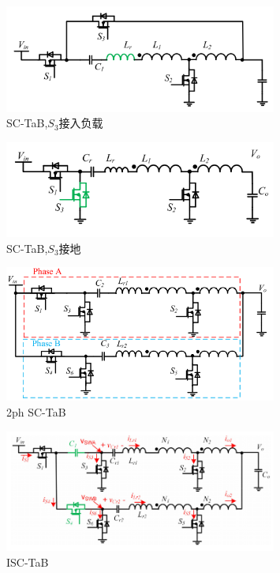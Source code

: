 \documentclass[12pt,a4paper]{report}
\begin{document}
\begin{figure}[h]
    \centering
    \includegraphics[width = 0.8\textwidth]{figures/SC-TaB1.png}
    \caption{SC-TaB,$S_3$接入负载}
\end{figure}
\begin{figure}[h]
    \centering
    \includegraphics[width = 0.8\textwidth]{figures/SC-TaB.png}
    \caption{SC-TaB,$S_3$接地}
\end{figure}
\begin{figure}[h]
    \centering
    \includegraphics[width = 0.8\textwidth]{figures/2ph SC-TaB.png}
    \caption{2ph SC-TaB}
\end{figure}
\begin{figure}[h]
    \centering
    \includegraphics[width = 0.8\textwidth]{figures/circuit diagram1.png}
    \caption{ISC-TaB}
\end{figure}
\end{document}
